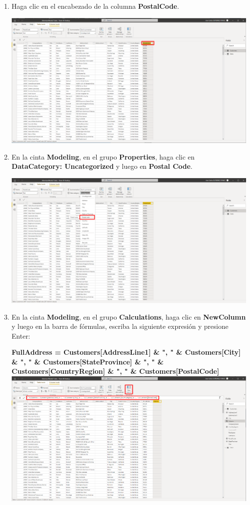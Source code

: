 \documentclass[12pt,letterpaper]{article}
\newcommand\tab[1][1cm]{\hspace*{#1}}
\begin{document}
\begin{enumerate}[\tab 1.]
\begin{center}
        \end{center}
        \item Haga clic en el encabezado de la columna \textbf{PostalCode}.
        \begin{center}
            \includegraphics[width=13cm]{./img/img32.png}
        \end{center}
        \item En la cinta \textbf{Modeling}, en el grupo \textbf{Properties}, haga clic en \textbf{DataCategory: Uncategorized} y luego en \textbf{Postal Code}.
        \begin{center}
            \includegraphics[width=13cm]{./img/img33.png}
        \end{center}
        \item En la cinta \textbf{Modeling}, en el grupo \textbf{Calculations}, haga clic en \textbf{NewColumn} y luego en la barra de fórmulas, escriba la siguiente expresión y presione Enter:
        \begin{center}
            \textbf{FullAddress = Customers[AddressLine1] \& ", " \& Customers[City] \& ", " \& Customers[StateProvince] \& ", " \& Customers[CountryRegion] \& ", " \& Customers[PostalCode]}
            \includegraphics[width=13cm]{./img/img34.png}

\end{center}
\end{enumerate}
\end{document}

